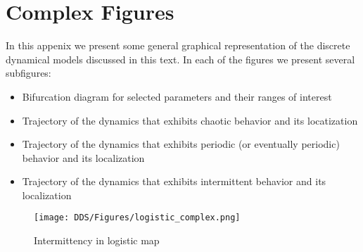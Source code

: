 \chapter{Complex Figures}
\label{sec:Appendix_complex_figures}
In this appenix we present some general graphical representation of the discrete dynamical models discussed in this text.
In each of the figures we present several subfigures:
\begin{itemize}
  \item Bifurcation diagram for selected parameters and their ranges of interest
  \item Trajectory of the dynamics that exhibits chaotic behavior and its locatization
  \item Trajectory of the dynamics that exhibits periodic (or eventually periodic) behavior and its localization
  \item Trajectory of the dynamics that exhibits intermittent behavior and its localization
\end{itemize}


\begin{figure}[!ht]
	\centering
	\texttt{[image: DDS/Figures/logistic\_complex.png]}
	\caption{Intermittency in logistic map}
	\label{fig:complex_logistic}
\end{figure}



\endinput